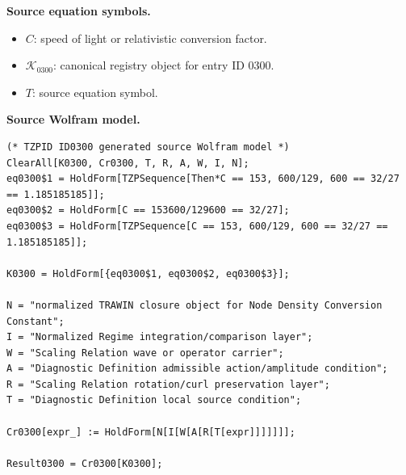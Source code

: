 \begin{minipage}[t]{0.49\linewidth}
\begingroup
\small
\raggedright
\textbf{Source equation symbols.}\par
\begin{itemize}[leftmargin=1.35em,itemsep=1pt,topsep=1pt,parsep=0pt]
    \item $C$: speed of light or relativistic conversion factor.
    \item $\mathcal{K}_{0300}$: canonical registry object for entry ID 0300.
    \item $T$: source equation symbol.
\end{itemize}
\endgroup
\end{minipage}\hfill
\begin{minipage}[t]{0.47\linewidth}
\begingroup
\scriptsize
\raggedright
\textbf{Source Wolfram model.}\par
\begin{Verbatim}[fontsize=\tiny,breaklines=true,breakanywhere=true]
(* TZPID ID0300 generated source Wolfram model *)
ClearAll[K0300, Cr0300, T, R, A, W, I, N];
eq0300$1 = HoldForm[TZPSequence[Then*C == 153, 600/129, 600 == 32/27 == 1.185185185]];
eq0300$2 = HoldForm[C == 153600/129600 == 32/27];
eq0300$3 = HoldForm[TZPSequence[C == 153, 600/129, 600 == 32/27 == 1.185185185]];

K0300 = HoldForm[{eq0300$1, eq0300$2, eq0300$3}];

N = "normalized TRAWIN closure object for Node Density Conversion Constant";
I = "Normalized Regime integration/comparison layer";
W = "Scaling Relation wave or operator carrier";
A = "Diagnostic Definition admissible action/amplitude condition";
R = "Scaling Relation rotation/curl preservation layer";
T = "Diagnostic Definition local source condition";

Cr0300[expr_] := HoldForm[N[I[W[A[R[T[expr]]]]]]];

Result0300 = Cr0300[K0300];
\end{Verbatim}
\endgroup
\end{minipage}

